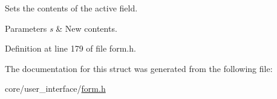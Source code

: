 Sets the contents of the active field. 


\begin{DoxyParams}{Parameters}
{\em s} & New contents. \\
\hline
\end{DoxyParams}


Definition at line 179 of file form.\+h.



The documentation for this struct was generated from the following file\+:\begin{DoxyCompactItemize}
\item 
core/user\+\_\+interface/\hyperlink{form_8h}{form.\+h}\end{DoxyCompactItemize}
